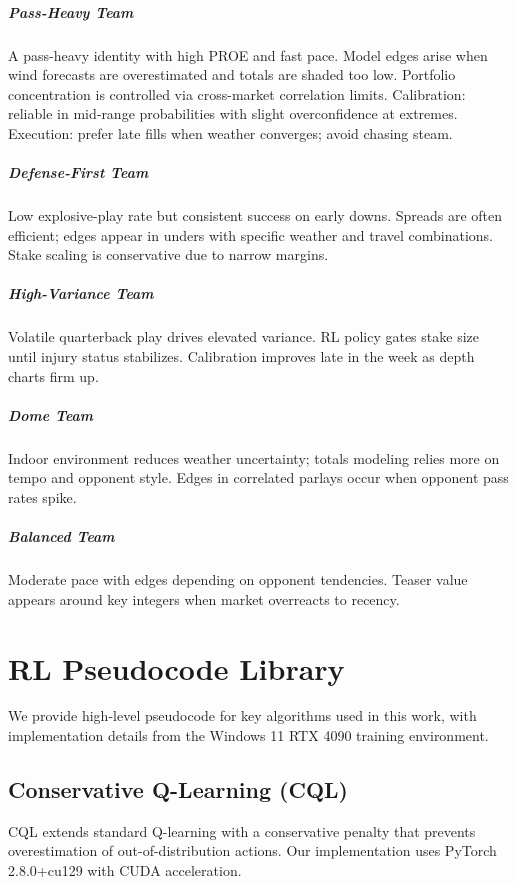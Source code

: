 \documentclass[12pt]{report}  %
\numberwithin{equation}{section}
\theoremstyle{plain}
\theoremstyle{definition}
\theoremstyle{remark}
\begin{document}
\paragraph{Pass-Heavy Team} A pass-heavy identity with high PROE and fast pace. Model edges arise when wind forecasts are overestimated and totals are shaded too low. Portfolio concentration is controlled via cross-market correlation limits. Calibration: reliable in mid‑range probabilities with slight overconfidence at extremes. Execution: prefer late fills when weather converges; avoid chasing steam.

\paragraph{Defense-First Team} Low explosive-play rate but consistent success on early downs. Spreads are often efficient; edges appear in unders with specific weather and travel combinations. Stake scaling is conservative due to narrow margins.

\paragraph{High-Variance Team} Volatile quarterback play drives elevated variance. RL policy gates stake size until injury status stabilizes. Calibration improves late in the week as depth charts firm up.

\paragraph{Dome Team} Indoor environment reduces weather uncertainty; totals modeling relies more on tempo and opponent style. Edges in correlated parlays occur when opponent pass rates spike.

\paragraph{Balanced Team} Moderate pace with edges depending on opponent tendencies. Teaser value appears around key integers when market overreacts to recency.


\chapter{RL Pseudocode Library}
We provide high-level pseudocode for key algorithms used in this work, with implementation details from the Windows 11 RTX 4090 training environment.

\section{Conservative Q-Learning (CQL)}
CQL extends standard Q-learning with a conservative penalty that prevents overestimation of out-of-distribution actions. Our implementation uses PyTorch 2.8.0+cu129 with CUDA acceleration.
\end{document}
